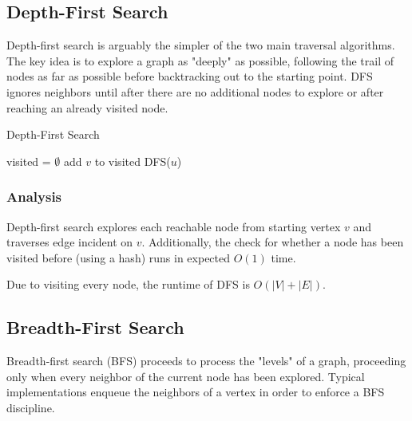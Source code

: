 \documentclass{standalone}
\begin{document}

\subsection{Depth-First Search}

Depth-first search is arguably the simpler of the two main traversal algorithms.
The key idea is to explore a graph as "deeply" as possible, following the trail
of nodes as far as possible before backtracking out to the starting point. DFS
ignores neighbors until after there are no additional nodes to explore or after
reaching an already visited node.


\begin{algorithm}
  \caption{Depth-First Search}
  \begin{algorithmic}
  \State visited = $\emptyset$
  \State add $v$ to visited
  \State DFS($u$)
    \EndIf
    \EndFor
    \EndProcedure
  \end{algorithmic}
\end{algorithm}



\subsubsection{Analysis}

Depth-first search explores each reachable node from starting vertex $v$ and traverses edge incident on $v$. Additionally, the check for whether a node has been visited before (using a hash) runs in expected $O(1)$ time.

Due to visiting every node, the runtime of DFS is $O(|V| + |E|)$.

\subsection{Breadth-First Search}

Breadth-first search (BFS) proceeds to process the "levels" of a graph, proceeding only when every neighbor of the current node has been explored. Typical implementations enqueue the neighbors of a vertex in order to enforce a BFS discipline.
\end{document}
